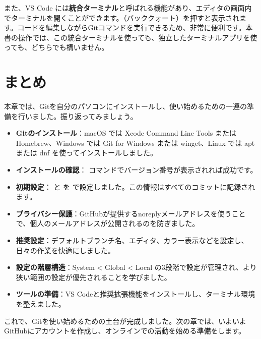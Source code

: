 また、VS Code には\textbf{統合ターミナル}と呼ばれる機能があり、エディタの画面内でターミナルを開くことができます。（バッククォート）を押すと表示されます。コードを編集しながらGitコマンドを実行できるため、非常に便利です。本書の操作では、この統合ターミナルを使っても、独立したターミナルアプリを使っても、どちらでも構いません。

\section{まとめ}

本章では、Gitを自分のパソコンにインストールし、使い始めるための一連の準備を行いました。振り返ってみましょう。

\begin{itemize}
  \item \textbf{Gitのインストール}：macOS では Xcode Command Line Tools または Homebrew、Windows では Git for Windows または winget、Linux では apt または dnf を使ってインストールしました。
  \item \textbf{インストールの確認}： コマンドでバージョン番号が表示されれば成功です。
  \item \textbf{初期設定}： と  を  で設定しました。この情報はすべてのコミットに記録されます。
  \item \textbf{プライバシー保護}：GitHubが提供するnoreplyメールアドレスを使うことで、個人のメールアドレスが公開されるのを防ぎました。
  \item \textbf{推奨設定}：デフォルトブランチ名、エディタ、カラー表示などを設定し、日々の作業を快適にしました。
  \item \textbf{設定の階層構造}：System < Global < Local の3段階で設定が管理され、より狭い範囲の設定が優先されることを学びました。
  \item \textbf{ツールの準備}：VS Codeと推奨拡張機能をインストールし、ターミナル環境を整えました。
\end{itemize}

これで、Gitを使い始めるための土台が完成しました。次の章では、いよいよGitHubにアカウントを作成し、オンラインでの活動を始める準備をします。
